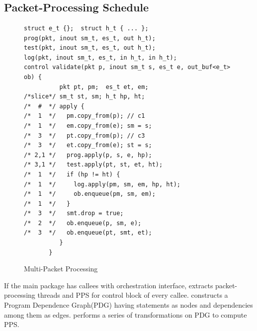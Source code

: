 \documentclass[letterpaper,twocolumn,10pt]{article}
\begin{document}
% 
% 




\section{\ucomp}
\subsection{Packet-Processing Schedule}
\label{subsubsection:packet-processing-schedule}


\label{subsubsection:packet-processing-schedule}
\begin{figure}[!h]
\begin{lstlisting}[frame=none]
struct e_t {};  struct h_t { ... };
prog(pkt, inout sm_t, es_t, out h_t);
test(pkt, inout sm_t, es_t, out h_t);
log(pkt, inout sm_t, es_t, in h_t, in h_t);
control validate(pkt p, inout sm_t s, es_t e, out_buf<e_t> ob) {
          pkt pt, pm;  es_t et, em;  
/*slice*/ sm_t st, sm; h_t hp, ht;
/*  #  */ apply {
/*  1  */   pm.copy_from(p); // c1
/*  1  */   em.copy_from(e); sm = s;
/*  3  */   pt.copy_from(p); // c3 
/*  3  */   et.copy_from(e); st = s;
/* 2,1 */   prog.apply(p, s, e, hp); 
/* 3,1 */   test.apply(pt, st, et, ht); 
/*  1  */   if (hp != ht) {
/*  1  */     log.apply(pm, sm, em, hp, ht);
/*  1  */     ob.enqueue(pm, sm, em);
/*  1  */   }
/*  3  */   smt.drop = true;
/*  2  */   ob.enqueue(p, sm, e);
/*  3  */   ob.enqueue(pt, smt, et);
          }
       }
\end{lstlisting}
\caption{Multi-Packet Processing}
\label{fig:multi-packet-processing}
\end{figure}
If the main package has callees with orchestration interface, \ucomp 
extracts packet-processing threads and PPS for control block of every 
callee.
\ucomp constructs a Program Dependence Graph(PDG) 
\cite{Ferrante:1987:PDG:24039.24041} having statements as nodes and 
dependencies among them as edges. 
\ucomp  performs a series of transformations on PDG to compute PPS.
\end{document}
